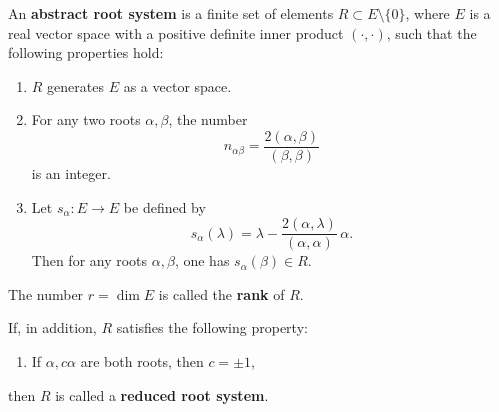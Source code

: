 \documentclass[12pt]{article}
\begin{document}
\begin{definition}
    An \textbf{abstract root system} is a finite set of elements $R \subset E \setminus \{0\}$, where $E$ is a real vector space with a positive definite inner product $(\cdot,\cdot)$, such that the following properties hold:
    \begin{enumerate}
        \item[(R1)] $R$ generates $E$ as a vector space.

        \item[(R2)] For any two roots $\alpha,\beta$, the number
              \begin{equation}\label{eq:root-int}
                  n_{\alpha\beta} = \frac{2(\alpha,\beta)}{(\beta,\beta)}
              \end{equation}
              is an integer.

        \item[(R3)] Let $s_\alpha : E \to E$ be defined by
              \begin{equation}\label{eq:root-reflection}
                  s_\alpha(\lambda) = \lambda - \frac{2(\alpha,\lambda)}{(\alpha,\alpha)}\,\alpha.
              \end{equation}
              Then for any roots $\alpha,\beta$, one has $s_\alpha(\beta) \in R$.
    \end{enumerate}

    The number $r = \dim E$ is called the \textbf{rank} of $R$.

    If, in addition, $R$ satisfies the following property:
    \begin{enumerate}
        \item[(R4)] If $\alpha, c\alpha$ are both roots, then $c = \pm 1$,
    \end{enumerate}
    then $R$ is called a \textbf{reduced root system}.
\end{definition}
\end{document}
